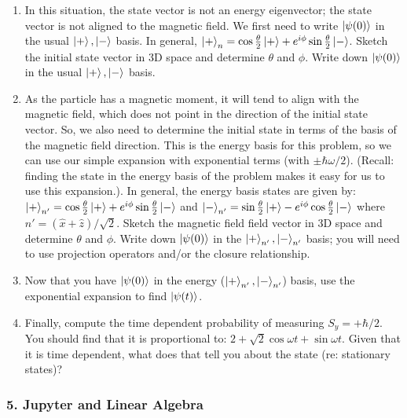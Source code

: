 \documentclass[
]{article}
\providecommand{\tightlist}{%
  \setlength{\itemsep}{0pt}\setlength{\parskip}{0pt}}
\providecommand{\tightlist}{%
  \setlength{\itemsep}{0pt}\setlength{\parskip}{0pt}}
\begin{document}
\begin{enumerate}
\def\labelenumi{\arabic{enumi}.}
\tightlist
\item
  In this situation, the state vector is not an energy eigenvector; the
  state vector is not aligned to the magnetic field. We first need to
  write \(\ket{\psi(0)}\) in the usual \(\ket{+}, \ket{-}\) basis. In
  general,
  \(\ket{+}_n = \cos\frac{\theta}{2}\ket{+} + e^{i\phi}\sin\frac{\theta}{2}\ket{-}\).
  Sketch the initial state vector in 3D space and determine \(\theta\)
  and \(\phi\). Write down \(\ket{\psi(0)}\) in the usual
  \(\ket{+}, \ket{-}\) basis.
\item
  As the particle has a magnetic moment, it will tend to align with the
  magnetic field, which does not point in the direction of the initial
  state vector. So, we also need to determine the initial state in terms
  of the basis of the magnetic field direction. This is the energy basis
  for this problem, so we can use our simple expansion with exponential
  terms (with \(\pm \hbar \omega/2\)). (Recall: finding the state in the
  energy basis of the problem makes it easy for us to use this
  expansion.). In general, the energy basis states are given by:
  \(\ket{+}_{n'} = \cos\frac{\theta}{2}\ket{+} + e^{i\phi}\sin\frac{\theta}{2}\ket{-}\)
  and
  \(\ket{-}_{n'} = \sin\frac{\theta}{2}\ket{+} - e^{i\phi}\cos\frac{\theta}{2}\ket{-}\)
  where \(\hat{n}' = (\hat{x}+\hat{z})/\sqrt{2}\). Sketch the magnetic
  field field vector in 3D space and determine \(\theta\) and \(\phi\).
  Write down \(\ket{\psi(0)}\) in the \(\ket{+}_{n'}, \ket{-}_{n'}\)
  basis; you will need to use projection operators and/or the closure
  relationship.
\item
  Now that you have \(\ket{\psi(0)}\) in the energy
  (\(\ket{+}_{n'}, \ket{-}_{n'}\)) basis, use the exponential expansion
  to find \(\ket{\psi(t)}\).
\item
  Finally, compute the time dependent probability of measuring
  \(S_y = +\hbar/2\). You should find that it is proportional to:
  \(2 + \sqrt{2}\cos\omega t + \sin \omega t\). Given that it is time
  dependent, what does that tell you about the state (re: stationary
  states)?
\end{enumerate}

\hypertarget{jupyter-and-linear-algebra}{%
\subsubsection{5. Jupyter and Linear
Algebra}\label{jupyter-and-linear-algebra}}
\end{document}
